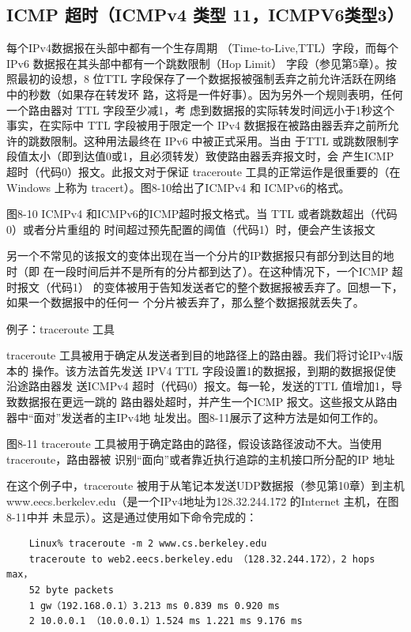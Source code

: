 \subsection{ICMP 超时（ICMPv4 类型 11，ICMPV6类型3）}
每个IPv4数据报在头部中都有一个生存周期 （Time-to-Live,TTL）字段，而每个IPv6
数据报在其头部中都有一个跳数限制（Hop Limit） 字段（参见第5章）。按照最初的设想，8
位TTL 字段保存了一个数据报被强制丢弃之前允许活跃在网络中的秒数（如果存在转发环
路，这将是一件好事）。因为另外一个规则表明，任何一个路由器对 TTL 字段至少减1，考
虑到数据报的实际转发时间远小于1秒这个事实，在实际中 TTL 字段被用于限定一个 IPv4
数据报在被路由器丢弃之前所允许的跳数限制。这种用法最终在 IPv6 中被正式采用。当由
于TTL 或跳数限制字段值太小（即到达值0或1，且必须转发）致使路由器丢弃报文时，会
产生ICMP超时（代码0）报文。此报文对于保证 traceroute 工具的正常运作是很重要的（在
Windows 上称为 tracert）。图8-10给出了ICMPv4 和 ICMPv6的格式。


图8-10	ICMPv4 和ICMPv6的ICMP超时报文格式。当 TTL 或者跳数超出（代码0）或者分片重组的
时间超过预先配置的阈值（代码1）时，便会产生该报文

另一个不常见的该报文的变体出现在当一个分片的IP数据报只有部分到达目的地时（即
在一段时间后并不是所有的分片都到达了）。在这种情况下，一个ICMP 超时报文（代码1）
的变体被用于告知发送者它的整个数据报被丢弃了。回想一下，如果一个数据报中的任何一
个分片被丢弃了，那么整个数据报就丢失了。

例子：traceroute 工具

traceroute 工具被用于确定从发送者到目的地路径上的路由器。我们将讨论IPv4版本的
操作。该方法首先发送 IPV4 TTL 字段设置1的数据报，到期的数据报促使沿途路由器发
送ICMPv4 超时（代码0）报文。每一轮，发送的TTL 值增加1，导致数据报在更远一跳的
路由器处超时，并产生一个ICMP 报文。这些报文从路由器中“面对”发送者的主IPv4地
址发出。图8-11展示了这种方法是如何工作的。


图8-11
traceroute 工具被用于确定路由的路径，假设该路径波动不大。当使用 traceroute，路由器被
识别“面向”或者靠近执行追踪的主机接口所分配的IP 地址

在这个例子中，traceroute 被用于从笔记本发送UDP数据报（参见第10章）到主机
www.eecs.berkelev.edu（是一个IPv4地址为128.32.244.172 的Internet 主机，在图8-11中并
未显示）。这是通过使用如下命令完成的：

\begin{verbatim}
	Linux% traceroute -m 2 www.cs.berkeley.edu
	traceroute to web2.eecs.berkeley.edu （128.32.244.172），2 hops max，
	52 byte packets
	1 gw（192.168.0.1）3.213 ms 0.839 ms 0.920 ms
	2 10.0.0.1 （10.0.0.1）1.524 ms 1.221 ms 9.176 ms
\end{verbatim}

